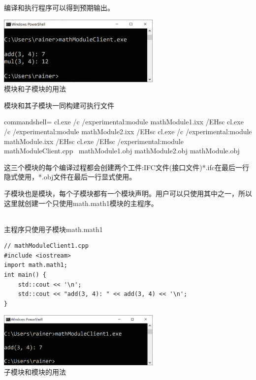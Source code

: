 编译和执行程序可以得到预期输出。

\begin{center}
\includegraphics[width=0.6\textwidth]{content/3/chapter4/images/21.png}\\
模块和子模块的用法
\end{center}

\begin{tcolorbox}[breakable,enhanced jigsaw,colback=blue!5!white,colframe=blue!75!black,title={使用Microsoft编译器构建可执行文件}]
	
模块和其子模块一同构建可执行文件

\begin{tcblisting}{commandshell={}}
cl.exe /c /experimental:module mathModule1.ixx /EHsc
cl.exe /c /experimental:module mathModule2.ixx /EHsc
cl.exe /c /experimental:module mathModule.ixx /EHsc
cl.exe /EHsc /experimental:module mathModuleClient.cpp \
  mathModule1.obj mathModule2.obj mathModule.obj
\end{tcblisting}

这三个模块的每个编译过程都会创建两个工件:IFC文件(接口文件)*.ifc在最后一行隐式使用，*.obj文件在最后一行显式使用。

\end{tcolorbox}

子模块也是模块，每个子模块都有一个模块声明。用户可以只使用其中之一，所以这里就创建一个只使用math.math1模块的主程序。

\hspace*{\fill} \\ %
\noindent
主程序只使用子模块math.math1
\begin{lstlisting}[style=styleCXX]
// mathModuleClient1.cpp
#include <iostream>
import math.math1;
int main() {
	std::cout << '\n';
	std::cout << "add(3, 4): " << add(3, 4) << '\n';
}
\end{lstlisting}

\begin{center}
\includegraphics[width=0.6\textwidth]{content/3/chapter4/images/22.png}\\
子模块和模块的用法
\end{center}

